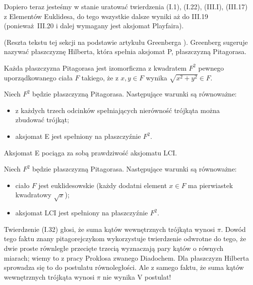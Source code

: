 Dopiero teraz jesteśmy w stanie uratować twierdzenia (I.1), (I.22), (III.I), (III.17) z Elementów Euklidesa, do tego wszystkie dalsze wyniki aż do III.19 (ponieważ III.20 i dalej wymagany jest aksjomat Playfaira).


(Reszta tekstu tej sekcji na podstawie artykułu Greenberga \cite[s. 201]{greenberg_2010}).
Greenberg sugeruje nazywać płaszczyznę Hilberta, która spełnia aksjomat P, płaszczyzną Pitagorasa.

\begin{proposition}
    Każda płaszczyzna Pitagorasa jest izomorficzna z kwadratem $F^2$ pewnego uporządkowanego ciała $F$ takiego, że z $x, y \in F$ wynika $\sqrt{x^2 + y^2} \in F$.
\end{proposition}

\begin{proposition}
    Niech $F^2$ będzie płaszczyzną Pitagorasa.
    Następujące warunki są równoważne:
    \begin{itemize}
        \item z każdych trzech odcinków spełniających nierówność trójkąta można zbudować trójkąt; 
        \item aksjomat E jest spełniony na płaszczyźnie $F^2$.
    \end{itemize}
\end{proposition}

Aksjomat E pociąga za sobą prawdziwość aksjomatu LCI.

\begin{proposition}
    Niech $F^2$ będzie płaszczyzną Pitagorasa.
    Następujące warunki są równoważne:
    \begin{itemize}
        \item ciało $F$ jest euklidesowskie (każdy dodatni element $x \in F$ ma pierwiastek kwadratowy $\sqrt{x}$);
        \item aksjomat LCI jest spełniony na płaszczyźnie $F^2$.
    \end{itemize}
\end{proposition}

Twierdzenie (I.32) głosi, że suma kątów wewnętrznych trójkąta wynosi $\pi$.
Dowód tego faktu znany pitagorejczykom wykorzystuje twierdzenie odwrotne do tego, że dwie proste równległe przecięte trzecią wyznaczają pary kątów o równych miarach; wiemy to z pracy Proklosa zwanego Diadochem.
Dla płaszczyzn Hilberta sprowadza się to do postulatu równoległości.
Ale z samego faktu, że suma kątów wewnętrznych trójkąta wynosi $\pi$ nie wynika V postulat!

